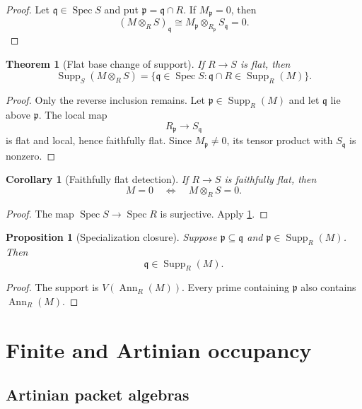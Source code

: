 \documentclass{aomart}
\newtheorem{theorem}{Theorem}[section]
\newtheorem{proposition}[proposition]{Proposition}
\newtheorem{corollary}[corollary]{Corollary}
\theoremstyle{definition}
\theoremstyle{remark}
\newcommand{\Spec}{\operatorname{Spec}}
\newcommand{\Supp}{\operatorname{Supp}}
\newcommand{\Ann}{\operatorname{Ann}}
\begin{document}
\begin{proof}
Let \(\mathfrak q\in\Spec S\) and put \(\mathfrak p=\mathfrak q\cap R\). If \(M_{\mathfrak p}=0\), then
\[
(M\otimes_RS)_{\mathfrak q}
\cong
M_{\mathfrak p}\otimes_{R_{\mathfrak p}}S_{\mathfrak q}
=0.
\]
\end{proof}

\begin{theorem}[Flat base change of support]\label{thm:flat_base_change_support}
If \(R\to S\) is flat, then
\[
\boxed{
\Supp_S(M\otimes_RS)
=
\{\mathfrak q\in\Spec S:\mathfrak q\cap R\in\Supp_R(M)\}.
}
\]
\end{theorem}

\begin{proof}
Only the reverse inclusion remains. Let \(\mathfrak p\in\Supp_R(M)\) and let \(\mathfrak q\) lie above \(\mathfrak p\). The local map
\[
R_{\mathfrak p}\longrightarrow S_{\mathfrak q}
\]
is flat and local, hence faithfully flat. Since \(M_{\mathfrak p}\neq0\), its tensor product with \(S_{\mathfrak q}\) is nonzero.
\end{proof}

\begin{corollary}[Faithfully flat detection]\label{cor:faithfully_flat_detection}
If \(R\to S\) is faithfully flat, then
\[
M=0
\quad\Longleftrightarrow\quad
M\otimes_RS=0.
\]
\end{corollary}

\begin{proof}
The map \(\Spec S\to\Spec R\) is surjective. Apply \cref{thm:flat_base_change_support}.
\end{proof}

\begin{proposition}[Specialization closure]\label{prop:specialization_closure}
Suppose \(\mathfrak p\subseteq\mathfrak q\) and \(\mathfrak p\in\Supp_R(M)\). Then
\[
\mathfrak q\in\Supp_R(M).
\]
\end{proposition}

\begin{proof}
The support is \(V(\Ann_R(M))\). Every prime containing \(\mathfrak p\) also contains \(\Ann_R(M)\).
\end{proof}

\section{Finite and Artinian occupancy}\label{sec:finiteoccupancy}

\subsection{Artinian packet algebras}
\end{document}
